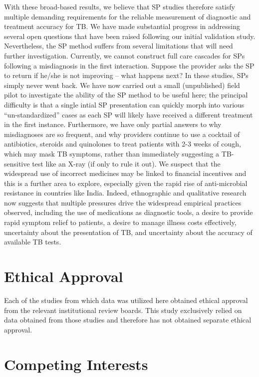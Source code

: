 \documentclass[fleqn,10pt]{wlscirep}
\begin{document}
With these broad-based results, we believe that SP studies therefore satisfy multiple demanding requirements for the reliable measurement of diagnostic and treatment accuracy for TB. We have made substantial progress in addressing several open questions that have been raised following our initial validation study. Nevertheless, the SP method suffers from several limitations that will need further investigation. Currently, we cannot construct full care cascades for SPs following a misdiagnosis in the first interaction. Suppose the provider asks the SP to return if he/she is not improving -- what happens next? In these studies, SPs simply never went back. We have now carried out a small (unpublished) field pilot to investigate the ability of the SP method to be useful here; the principal difficulty is that a single intial SP presentation can quickly morph into various ``un-standardized'' cases as each SP will likely have received a different treatment in the first instance. Furthermore, we have only partial answers to why misdiagnoses are so frequent, and why providers continue to use a cocktail of antibiotics, steroids and quinolones to treat patients with 2-3 weeks of cough, which may mask TB symptoms, rather than immediately suggesting a TB-sensitive test like an X-ray (if only to rule it out). We suspect that the widespread use of incorrect medicines may be linked to financial incentives and this is a further area to explore, especially given the rapid rise of anti-microbial resistance in countries like India. Indeed, ethnographic and qualitative research now suggests that multiple pressures drive the widespread empirical practices observed, including the use of medications as diagnostic tools, a desire to provide rapid symptom relief to patients, a desire to manage illness costs effectively, uncertainty about the presentation of TB, and uncertainty about the accuracy of available TB tests.\cite{mcdowell2016treatment}

\section*{Ethical Approval}

Each of the studies from which data was utilized here obtained ethical approval from the relevant institutional review boards. This study exclusively relied on data obtained from those studies and therefore has not obtained separate ethical approval.

\section*{Competing Interests}
\end{document}
